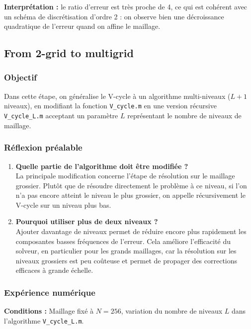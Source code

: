 \documentclass[12pt,a4paper]{article}
\begin{document}
\textbf{Interprétation :} le ratio d’erreur est très proche de 4, ce qui est cohérent avec un schéma de discrétisation d’ordre 2 : on observe bien une décroissance quadratique de l’erreur quand on affine le maillage.

\subsection{From 2-grid to multigrid}

\subsubsection*{Objectif}
Dans cette étape, on généralise le V-cycle à un algorithme multi-niveaux (\(L+1\) niveaux), en modifiant la fonction \texttt{V\_cycle.m} en une version récursive \texttt{V\_cycle\_L.m} acceptant un paramètre $L$ représentant le nombre de niveaux de maillage.

\subsubsection*{Réflexion préalable}
\begin{enumerate}
    \item \textbf{Quelle partie de l’algorithme doit être modifiée ?}\\
    La principale modification concerne l'étape de résolution sur le maillage grossier. Plutôt que de résoudre directement le problème à ce niveau, si l’on n’a pas encore atteint le niveau le plus grossier, on appelle récursivement le V-cycle sur un niveau plus bas.

    \item \textbf{Pourquoi utiliser plus de deux niveaux ?}\\
    Ajouter davantage de niveaux permet de réduire encore plus rapidement les composantes basses fréquences de l’erreur. Cela améliore l’efficacité du solveur, en particulier pour les grands maillages, car la résolution sur les niveaux grossiers est peu coûteuse et permet de propager des corrections efficaces à grande échelle.
\end{enumerate}

\subsubsection*{Expérience numérique}

\textbf{Conditions :} Maillage fixé à \(N = 256\), variation du nombre de niveaux \(L\) dans l’algorithme \texttt{V\_cycle\_L.m}.
\end{document}

